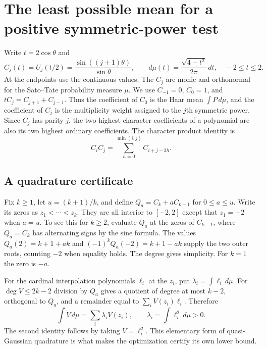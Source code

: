 \section{The least possible mean for a positive symmetric-power test}\label{sec:weights}
Write $t=2\cos\theta$ and
\[
 C_j(t)=U_j(t/2)=\frac{\sin((j+1)\theta)}{\sin\theta},
 \qquad d\mu(t)=\frac{\sqrt{4-t^2}}{2\pi}\,dt,\quad -2\le t\le2.
\]
At the endpoints use the continuous values. The $C_j$ are monic and
orthonormal for the Sato--Tate probability measure $\mu$. We use
$C_{-1}=0$, $C_0=1$, and $tC_j=C_{j+1}+C_{j-1}$.
Thus the coefficient of $C_0$ is the Haar mean $\int P\,d\mu$,
and the coefficient of $C_j$ is the multiplicity weight assigned to
the $j$th symmetric power. Since $C_j$ has parity $j$, the two
highest character coefficients of a polynomial are also its two
highest ordinary coefficients. The character product identity is
\[
 C_i C_j = \sum_{h=0}^{\min(i,j)} C_{i+j-2h}.
\]

\subsection{A quadrature certificate}
Fix $k\ge1$, let $u=(k+1)/k$, and define $Q_a=C_k+aC_{k-1}$
for $0\le a\le u$. Write its zeros as $z_1<\cdots<z_k$.
They are all interior to $[-2,2]$ except that $z_1=-2$ when
$a=u$. To see this for $k\ge2$, evaluate $Q_a$ at the zeros of
$C_{k-1}$, where $Q_a=C_k$ has alternating signs by the sine formula.
The values $Q_a(2)=k+1+ak$ and $(-1)^k Q_a(-2)=k+1-ak$ supply
the two outer roots, counting $-2$ when equality holds. The degree
gives simplicity. For $k=1$ the zero is $-a$.

For the cardinal interpolation polynomials $\ell_i$ at the $z_i$,
put $\lambda_i=\int \ell_i\,d\mu$. For $\deg V\le2k-2$ division
by $Q_a$ gives a quotient of degree at most $k-2$, orthogonal to
$Q_a$, and a remainder equal to $\sum_i V(z_i)\ell_i$. Therefore
\[
 \int V\,d\mu=\sum_i\lambda_i V(z_i),
 \qquad \lambda_i=\int\ell_i^2\,d\mu>0.
\]
The second identity follows by taking $V=\ell_i^2$.
This elementary form of quasi-Gaussian quadrature is what makes the
optimization certify its own lower bound.

